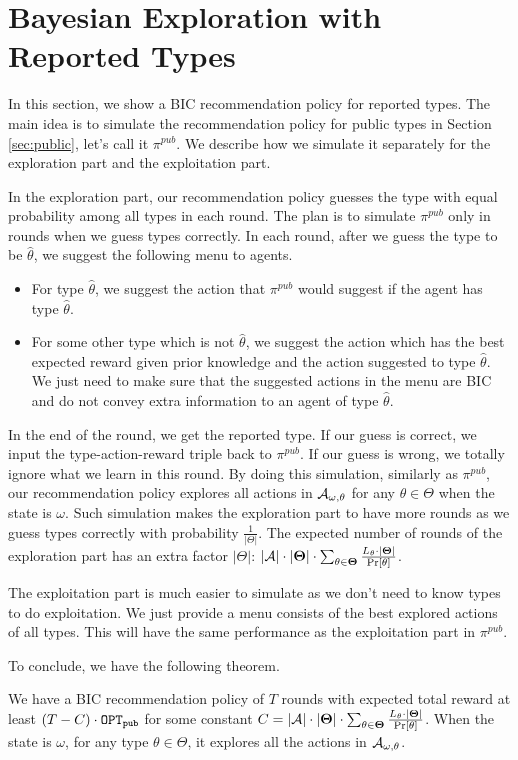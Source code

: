 
\section{Bayesian Exploration with Reported Types}
\label{sec:private_c}
In this section, we show a BIC recommendation policy for reported types. The main idea is to simulate the recommendation policy for public types in Section \ref{sec:public}, let's call it $\pi^{pub}$. We describe how we simulate it separately for the exploration part and the exploitation part.

In the exploration part, our recommendation policy guesses the type with equal probability among all types in each round. The plan is to simulate $\pi^{pub}$ only in rounds when we guess types correctly. In each round, after we guess the type to be $\hat{\theta}$, we suggest the following menu to agents.
\begin{itemize}
\item For type $\hat{\theta}$, we suggest the action that $\pi^{pub}$ would suggest if the agent has type $\hat{\theta}$.
\item For some other type which is not $\hat{\theta}$, we suggest the action which has the best expected reward given prior knowledge and the action suggested to type $\hat{\theta}$.  We just need to make sure that the suggested actions in the menu are BIC and do not convey extra information to an agent of type $\hat{\theta}$.
\end{itemize}
In the end of the round, we get the reported type. If our guess is correct, we input the type-action-reward triple back to $\pi^{pub}$. If our guess is wrong, we totally ignore what we learn in this round. By doing this simulation, similarly as $\pi^{pub}$, our recommendation policy explores all actions in $\mathcal{A}_{\omega,\theta}$ for any $\theta \in \varTheta$ when the state is $\omega$. Such simulation makes the exploration part to have more rounds as we guess types correctly with probability $\frac{1}{|\varTheta|}$. The expected number of rounds of the exploration part has an extra factor $|\varTheta|$: $|\mathcal{A}| \cdot |\bold{\Theta}| \cdot \sum_{\theta\in\bold{\Theta}} \frac{L_{\theta}\cdot |\bold{\Theta}|}{\Pr[\theta]}$.

The exploitation part is much easier to simulate as we don't need to know types to do exploitation. We just provide a menu consists of the best explored actions of all types. This will have the same performance as the exploitation part in $\pi^{pub}$.

To conclude, we have the following theorem.

\begin{theorem}
\label{thm:reported}
We have a BIC recommendation policy of $T$ rounds with expected total reward at least $\left(T - C \right) \cdot \mathtt{OPT}_{\mathtt{pub}}$ for some constant $C = |\mathcal{A}| \cdot |\bold{\Theta}| \cdot \sum_{\theta\in\bold{\Theta}} \frac{L_{\theta}\cdot |\bold{\Theta}|}{\Pr[\theta]}$. When the state is $\omega$, for any type $\theta \in \varTheta$, it explores all the actions in $\mathcal{A}_{\omega,\theta}$.
\end{theorem}
